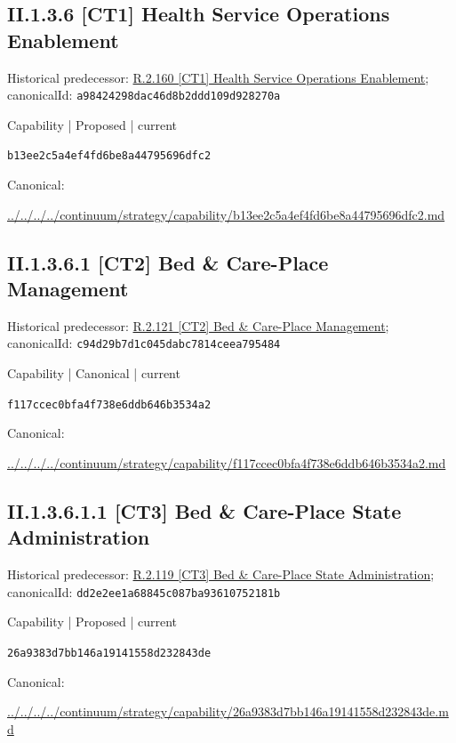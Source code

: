 \documentclass[10pt,a4paper]{article}
\begin{document}
\subsection*{II.1.3.6 [CT1] Health Service Operations Enablement}
Historical predecessor: \hyperref[element-a98424298dac46d8b2ddd109d928270a]{R.2.160 [CT1] Health Service Operations Enablement}; canonicalId: \texttt{a98424298dac46d8b2ddd109d928270a}\par
\label{element-b13ee2c5a4ef4fd6be8a44795696dfc2}
{\small Capability | Proposed | current}\par
\texttt{b13ee2c5a4ef4fd6be8a44795696dfc2}\par
Canonical: \par
{\footnotesize\url{../../../../continuum/strategy/capability/b13ee2c5a4ef4fd6be8a44795696dfc2.md}}\par
\subsection*{II.1.3.6.1 [CT2] Bed \& Care-Place Management}
Historical predecessor: \hyperref[element-c94d29b7d1c045dabc7814ceea795484]{R.2.121 [CT2] Bed \& Care-Place Management}; canonicalId: \texttt{c94d29b7d1c045dabc7814ceea795484}\par
\label{element-f117ccec0bfa4f738e6ddb646b3534a2}
{\small Capability | Canonical | current}\par
\texttt{f117ccec0bfa4f738e6ddb646b3534a2}\par
Canonical: \par
{\footnotesize\url{../../../../continuum/strategy/capability/f117ccec0bfa4f738e6ddb646b3534a2.md}}\par
\subsection*{II.1.3.6.1.1 [CT3] Bed \& Care-Place State Administration}
Historical predecessor: \hyperref[element-dd2e2ee1a68845c087ba93610752181b]{R.2.119 [CT3] Bed \& Care-Place State Administration}; canonicalId: \texttt{dd2e2ee1a68845c087ba93610752181b}\par
\label{element-26a9383d7bb146a19141558d232843de}
{\small Capability | Proposed | current}\par
\texttt{26a9383d7bb146a19141558d232843de}\par
Canonical: \par
{\footnotesize\url{../../../../continuum/strategy/capability/26a9383d7bb146a19141558d232843de.md}}\par
\end{document}
